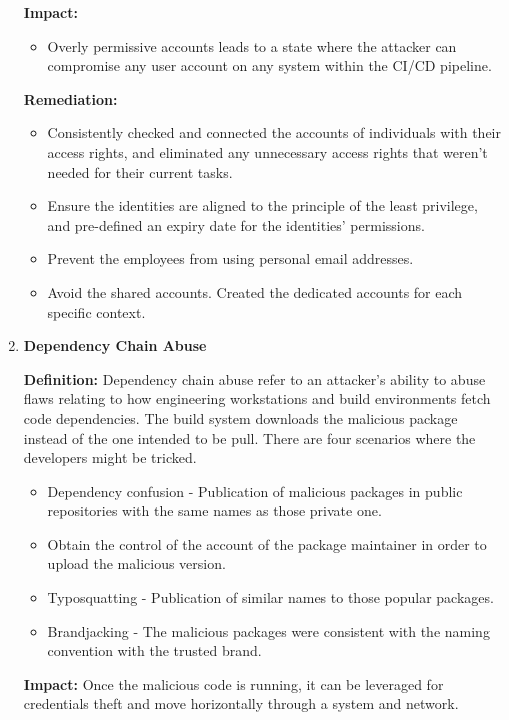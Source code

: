 \begin{enumerate}[label=(\arabic*)]
    \textbf{Impact: }
        \begin{itemize}
            \item Overly permissive accounts leads to a state where the attacker can compromise any user
            account on any system within the CI/CD pipeline.
        \end{itemize}

    \textbf{Remediation:}
        \begin{itemize}
            \item Consistently checked and connected the accounts of individuals with their access rights, 
            and eliminated any unnecessary access rights that weren't needed for their current tasks.
            \item Ensure the identities are aligned to the principle of the least privilege, and pre-defined an expiry date 
            for the identities' permissions.
            \item Prevent the employees from using personal email addresses.
            \item Avoid the shared accounts. Created the dedicated accounts for each specific context.
        \end{itemize}
    \item \textbf{Dependency Chain Abuse}

    \textbf{Definition: }
        Dependency chain abuse refer to an attacker's ability to abuse flaws relating to how 
        engineering workstations and build environments fetch code dependencies. The build system downloads the 
        malicious package instead of the one intended to be pull. There are four scenarios where the developers might be tricked.
        \begin{itemize}
            \item Dependency confusion - Publication of malicious packages in public repositories with the same 
            names as those private one.
            \item Obtain the control of the account of the package maintainer in order to upload the malicious version.
            \item Typosquatting - Publication of similar names to those popular packages.
            \item Brandjacking - The malicious packages were consistent with the naming convention with the trusted brand.
        \end{itemize}

    \textbf{Impact: }
        Once the malicious code is running, it can be leveraged for credentials theft and move horizontally through a system and 
        network.


\end{enumerate}
